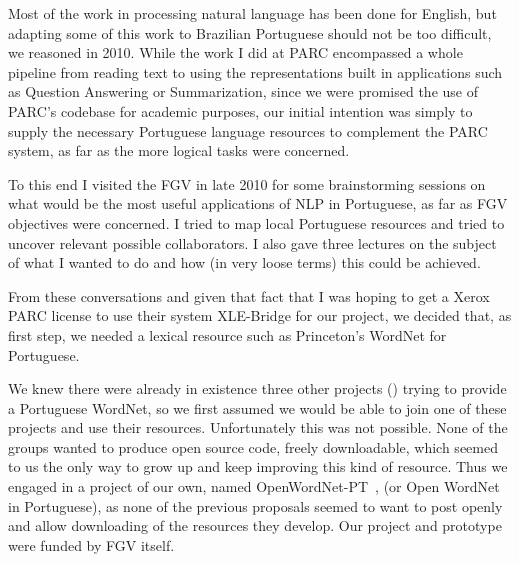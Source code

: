 Most of the work in processing natural language has been done for
English, but adapting some of this work to Brazilian Portuguese should
not be too difficult, we reasoned in 2010. While the work I did at
PARC encompassed a whole pipeline from reading text to using the
representations built in applications such as Question Answering or
Summarization, since we were promised the use of PARC's codebase for
academic purposes, our initial intention was simply to supply the
necessary Portuguese language resources to complement the PARC system,
as far as the more logical tasks were concerned.
 
To this end I visited the FGV in late 2010 for some brainstorming
sessions on what would be the most useful applications of NLP in
Portuguese, as far as FGV objectives were concerned. I tried to map
local Portuguese resources and tried to uncover relevant possible
collaborators. I also gave three lectures on the subject of what I
wanted to do and how (in very loose terms) this could be achieved.
 
From these conversations and given that fact that I was hoping to get
a Xerox PARC license to use their system XLE-Bridge for our project,
we decided that, as first step, we needed a lexical resource such as
Princeton's WordNet for Portuguese.

We knew there were already in existence three other projects
(\cite{wn1, wn2, wn3}) trying to provide a Portuguese WordNet, so we
first assumed we would be able to join one of these projects and use
their resources. Unfortunately this was not possible. None of the
groups wanted to produce open source code, freely downloadable, which
seemed to us the only way to grow up and keep improving this kind of
resource.  Thus we engaged in a project of our own, named
OpenWordNet-PT~\cite{GWA:2012:VCP:AR}, (or Open WordNet in
Portuguese), as none of the previous proposals seemed to want to post
openly and allow downloading of the resources they develop. Our
project and prototype were funded by FGV itself.


